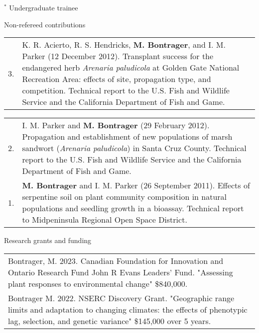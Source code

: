 \documentclass[letterpaper,11pt,oneside]{article}
\begin{document}
\smallskip
\noindent $^{*}$ Undergraduate trainee

\bigskip




\noindent\Large{Non-refereed contributions}  
\normalsize
\medskip

\def\arraystretch{1.4}
\noindent \begin{tabular}{@{} p{0.5cm} >{\raggedright\arraybackslash}p{16.7cm}}
3. & K. R. Acierto, R. S. Hendricks, \textbf{M. Bontrager}, and I. M. Parker (12 December 2012). Transplant success for the endangered herb \textit{Arenaria paludicola} at Golden Gate National Recreation Area: effects of site, propagation type, and competition. Technical report to the U.S. Fish and Wildlife Service and the California Department of Fish and Game. \\
\end{tabular}

\def\arraystretch{1.4}
\noindent \begin{tabular}{@{} p{0.5cm} >{\raggedright\arraybackslash}p{16.7cm}}
2. & I. M. Parker and \textbf{M. Bontrager} (29 February 2012). Propagation and establishment of new populations of marsh sandwort (\textit{Arenaria paludicola}) in Santa Cruz County. Technical report to the U.S. Fish and Wildlife Service and the California Department of Fish and Game. \\
1. & \textbf{M. Bontrager} and I. M. Parker (26 September 2011). Effects of serpentine soil on plant community composition in natural populations and seedling growth in a bioassay. Technical report to Midpeninsula Regional Open Space District. \\
\end{tabular}

\bigskip

\noindent\Large{Research grants and funding}
\normalsize
\medskip


\noindent \begin{tabular}{@{} >{\raggedright\arraybackslash}p{17.2cm}}
Bontrager, M. 2023. Canadian Foundation for Innovation and Ontario Research Fund John R Evans Leaders' Fund. "Assessing plant responses to environmental change" \$840,000. \\

Bontrager M. 2022. NSERC Discovery Grant. "Geographic range limits and adaptation to changing climates: the effects of phenotypic lag, selection, and genetic variance" \$145,000 over 5 years. \\
\end{tabular}
\end{document}
